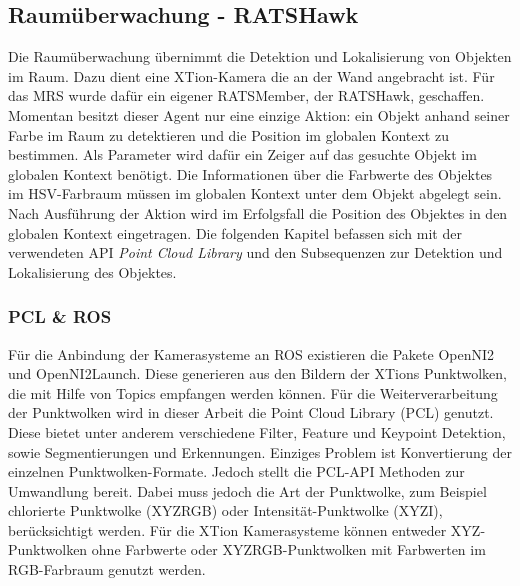 \subsection{Raumüberwachung - RATSHawk}
\label{sec:hawk}
Die Raumüberwachung übernimmt die Detektion und Lokalisierung von Objekten im Raum. Dazu dient eine XTion-Kamera die an der Wand angebracht ist. Für das MRS wurde dafür ein eigener RATSMember, der RATSHawk, geschaffen. Momentan besitzt dieser Agent nur eine einzige Aktion: ein Objekt anhand seiner Farbe im Raum zu detektieren und die Position im globalen Kontext zu bestimmen. Als Parameter wird dafür ein Zeiger auf das gesuchte Objekt im globalen Kontext benötigt. Die Informationen über die Farbwerte des Objektes im HSV-Farbraum müssen im globalen Kontext unter dem Objekt abgelegt sein. Nach Ausführung der Aktion wird im Erfolgsfall die Position des Objektes in den globalen Kontext eingetragen. Die folgenden Kapitel befassen sich mit der verwendeten API \textit{Point Cloud Library} und den Subsequenzen zur Detektion und Lokalisierung des Objektes.

\subsubsection{PCL \& ROS}
Für die Anbindung der Kamerasysteme an ROS existieren die Pakete OpenNI2 und OpenNI2Launch. Diese generieren aus den Bildern der XTions Punktwolken, die mit Hilfe von Topics empfangen werden können. Für die Weiterverarbeitung der Punktwolken wird in dieser Arbeit die Point Cloud Library (PCL) genutzt. Diese bietet unter anderem verschiedene Filter, Feature und Keypoint Detektion, sowie Segmentierungen und Erkennungen. Einziges Problem ist Konvertierung der einzelnen Punktwolken-Formate. Jedoch stellt die PCL-API Methoden zur Umwandlung bereit. Dabei muss jedoch die Art der Punktwolke, zum Beispiel chlorierte Punktwolke (XYZRGB) oder Intensität-Punktwolke (XYZI), berücksichtigt werden. Für die XTion Kamerasysteme können entweder XYZ-Punktwolken ohne Farbwerte oder XYZRGB-Punktwolken mit Farbwerten im RGB-Farbraum genutzt werden.

